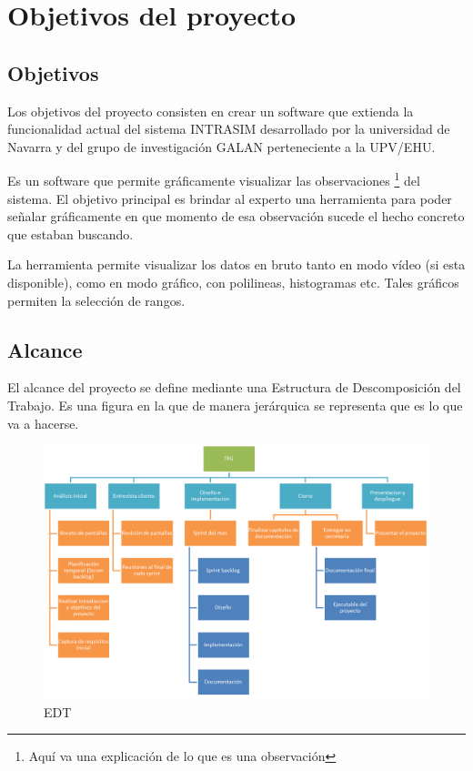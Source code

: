 \chapter{Objetivos del proyecto}


\section{Objetivos}
Los objetivos del proyecto consisten en crear un software que extienda la funcionalidad actual del sistema INTRASIM desarrollado 
por la universidad de Navarra y del grupo de investigación GALAN perteneciente a la UPV/EHU.

Es un software que permite gráficamente visualizar las observaciones \footnote{Aquí va una explicación de lo que es una observación} del sistema.
El objetivo principal es brindar al experto una herramienta para poder señalar gráficamente en que momento de esa 
observación sucede el hecho concreto que estaban buscando.

La herramienta permite visualizar los datos en bruto tanto en modo v\'{i}deo (si esta disponible), como en modo gr\'{a}fico, con polilineas, histogramas etc. Tales gráficos permiten la selección de rangos.

\section{Alcance}
El alcance del proyecto se define mediante una Estructura de Descomposición del Trabajo. Es una figura en la que de manera jer\'{a}rquica
se representa que es lo que va a hacerse.
\begin{figure}[H]
    \centering
    \includegraphics[width=1\linewidth]{./Figures/EDT}
    \caption[Alcance del proyecto]{EDT}
    \label{fig:Alcance}
\end{figure}

